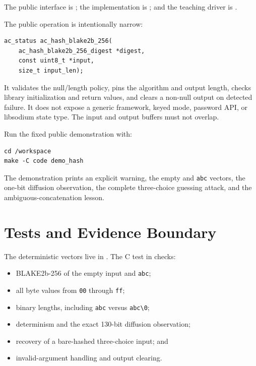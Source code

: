 The public interface is ; the implementation is
; and the teaching driver is
.

The public operation is intentionally narrow:

\begin{verbatim}
ac_status ac_hash_blake2b_256(
    ac_hash_blake2b_256_digest *digest,
    const uint8_t *input,
    size_t input_len);
\end{verbatim}

It validates the null/length policy, pins the algorithm and output length,
checks library initialization and return values, and clears a non-null output
on detected failure. It does not expose a generic framework, keyed mode,
password API, or libsodium state type. The input and output buffers must not
overlap.

Run the fixed public demonstration with:

\begin{verbatim}
cd /workspace
make -C code demo_hash
\end{verbatim}

The demonstration prints an explicit warning, the empty and \texttt{abc}
vectors, the one-bit diffusion observation, the complete three-choice guessing
attack, and the ambiguous-concatenation lesson.

\section{Tests and Evidence Boundary}

The deterministic vectors live in
. The C test in
 checks:

\begin{itemize}
    \item BLAKE2b-256 of the empty input and \texttt{abc};
    \item all byte values from \texttt{00} through \texttt{ff};
    \item binary lengths, including \texttt{abc} versus \texttt{abc\textbackslash0};
    \item determinism and the exact 130-bit diffusion observation;
    \item recovery of a bare-hashed three-choice input; and
    \item invalid-argument handling and output clearing.
\end{itemize}

